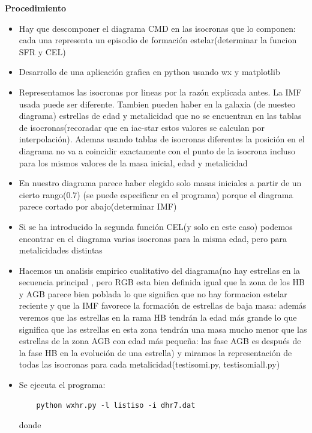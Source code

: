 \documentclass[10pt]{book}
\begin{document}
\textbf{Procedimiento}
\begin{itemize}
 \item Hay que descomponer el diagrama CMD en las isocronas que lo componen: cada una representa un episodio de formación estelar(determinar la funcion SFR y CEL)
\item Desarrollo de una aplicación grafica en python usando wx y matplotlib 
	\item Representamos las isocronas por lineas  por la razón explicada antes. La IMF usada puede ser diferente. Tambien pueden haber en la galaxia (de nuesteo diagrama) estrellas de edad y metalicidad que no se encuentran en las tablas de isocronas(recoradar que en iac-star estos valores se calculan por interpolación). Ademas usando tablas de isocronas diferentes la posición en el diagrama no va a coincidir exactamente con el punto de la isocrona incluso para los mismos valores de la masa inicial, edad y metalicidad
\item En nuestro diagrama parece haber elegido solo masas iniciales a partir de un cierto rango(0.7) (se puede especificar en el programa) porque el diagrama parece cortado por abajo(determinar IMF)
\item Si se ha introducido la segunda función CEL(y solo en este caso) podemos encontrar en el diagrama varias isocronas para la misma edad, pero para metalicidades distintas
\item Hacemos un analisis empirico cualitativo del diagrama(no hay estrellas en la secuencia principal , pero RGB esta bien definida igual que la zona de los HB y AGB parece bien poblada lo que significa que no hay formacion estelar reciente y que la IMF favorece la formación de estrellas de baja masa: además veremos que las estrellas en la rama HB tendrán la edad más grande lo que significa que las estrellas en esta zona tendrán una masa mucho menor que las estrellas de la zona AGB con edad más pequeña: las fase AGB es después de la fase HB en la evolución de una estrella) y miramos la representación de todas las isocronas para cada metalicidad(testisomi.py, testisomiall.py) 
\item Se ejecuta el programa:
\begin{verbatim}
	python wxhr.py -l listiso -i dhr7.dat
\end{verbatim}
donde


\end{itemize}
\end{document}
